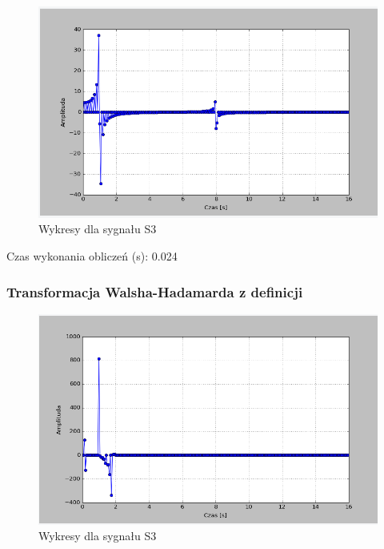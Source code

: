 \documentclass{article}
\begin{document}
{            
                \begin{figure}[h!]
                    \centering
                    \includegraphics[width=1\textwidth]{img/dcts3.png}
                    \caption{Wykresy dla sygnału S3}
                \end{figure}
                \FloatBarrier

                Czas wykonania obliczeń (s): 0.024
            
            \subsubsection{Transformacja Walsha-Hadamarda z definicji}

            
                \begin{figure}[h!]
                    \centering
                    \includegraphics[width=1\textwidth]{img/walshs3.png}
                    \caption{Wykresy dla sygnału S3}
                \end{figure}
                \FloatBarrier

}
\end{document}
